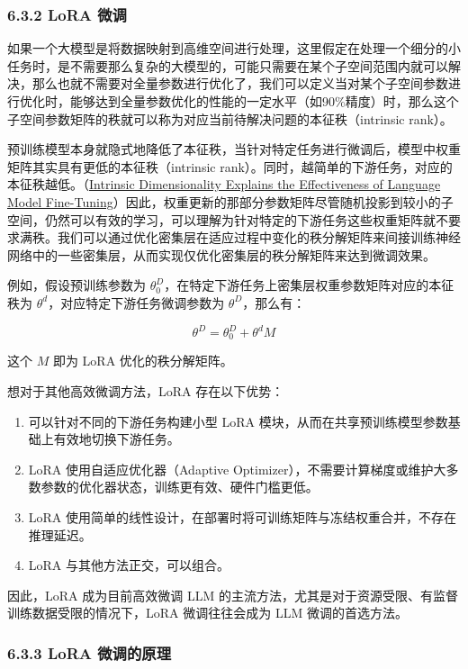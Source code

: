 \documentclass[
]{article}
\providecommand{\tightlist}{%
  \setlength{\itemsep}{0pt}\setlength{\parskip}{0pt}}
\begin{document}
\subsubsection{6.3.2 LoRA 微调}\label{lora-ux5faeux8c03}

如果一个大模型是将数据映射到高维空间进行处理，这里假定在处理一个细分的小任务时，是不需要那么复杂的大模型的，可能只需要在某个子空间范围内就可以解决，那么也就不需要对全量参数进行优化了，我们可以定义当对某个子空间参数进行优化时，能够达到全量参数优化的性能的一定水平（如90\%精度）时，那么这个子空间参数矩阵的秩就可以称为对应当前待解决问题的本征秩（intrinsic
rank）。

预训练模型本身就隐式地降低了本征秩，当针对特定任务进行微调后，模型中权重矩阵其实具有更低的本征秩（intrinsic
rank）。同时，越简单的下游任务，对应的本征秩越低。（\href{https://arxiv.org/abs/2012.13255}{Intrinsic
Dimensionality Explains the Effectiveness of Language Model
Fine-Tuning}）因此，权重更新的那部分参数矩阵尽管随机投影到较小的子空间，仍然可以有效的学习，可以理解为针对特定的下游任务这些权重矩阵就不要求满秩。我们可以通过优化密集层在适应过程中变化的秩分解矩阵来间接训练神经网络中的一些密集层，从而实现仅优化密集层的秩分解矩阵来达到微调效果。

例如，假设预训练参数为
\(\theta^D_0\)，在特定下游任务上密集层权重参数矩阵对应的本征秩为
\(\theta^d\)，对应特定下游任务微调参数为 \(\theta^D\)，那么有：

\[\theta^D = \theta^D_0 + \theta^d M\]

这个 \(M\) 即为 LoRA 优化的秩分解矩阵。

想对于其他高效微调方法，LoRA 存在以下优势：

\begin{enumerate}
\def\labelenumi{\arabic{enumi}.}
\tightlist
\item
  可以针对不同的下游任务构建小型 LoRA
  模块，从而在共享预训练模型参数基础上有效地切换下游任务。
\item
  LoRA 使用自适应优化器（Adaptive
  Optimizer），不需要计算梯度或维护大多数参数的优化器状态，训练更有效、硬件门槛更低。
\item
  LoRA
  使用简单的线性设计，在部署时将可训练矩阵与冻结权重合并，不存在推理延迟。
\item
  LoRA 与其他方法正交，可以组合。
\end{enumerate}

因此，LoRA 成为目前高效微调 LLM
的主流方法，尤其是对于资源受限、有监督训练数据受限的情况下，LoRA
微调往往会成为 LLM 微调的首选方法。

\subsubsection{6.3.3 LoRA
微调的原理}\label{lora-ux5faeux8c03ux7684ux539fux7406}
\end{document}
